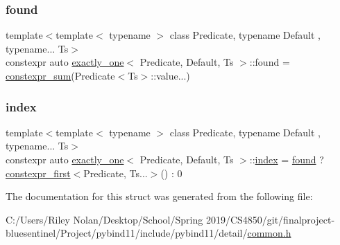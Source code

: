 \subsubsection{\texorpdfstring{found}{found}}
{\footnotesize\ttfamily template$<$template$<$ typename $>$ class Predicate, typename Default , typename... Ts$>$ \\
constexpr auto \mbox{\hyperlink{structexactly__one}{exactly\+\_\+one}}$<$ Predicate, Default, Ts $>$\+::found = \mbox{\hyperlink{detail_2common_8h_ac8088319c435e17ebb16da84203e9e3f}{constexpr\+\_\+sum}}(Predicate$<$Ts$>$\+::value...)\hspace{0.3cm}{\ttfamily [static]}}

\mbox{\label{structexactly__one_af0f0e1092da1fbf5d87040bb9428e613}} 
\subsubsection{\texorpdfstring{index}{index}}
{\footnotesize\ttfamily template$<$template$<$ typename $>$ class Predicate, typename Default , typename... Ts$>$ \\
constexpr auto \mbox{\hyperlink{structexactly__one}{exactly\+\_\+one}}$<$ Predicate, Default, Ts $>$\+::\mbox{\hyperlink{_s_d_l__opengl__glext_8h_a57f14e05b1900f16a2da82ade47d0c6d}{index}} = \mbox{\hyperlink{structexactly__one_a2e88399d33d5e51e1b27f785259f408c}{found}} ? \mbox{\hyperlink{detail_2common_8h_a3b338d68ac276f1ac405ef556cca63ad}{constexpr\+\_\+first}}$<$Predicate, Ts...$>$() \+: 0\hspace{0.3cm}{\ttfamily [static]}}



The documentation for this struct was generated from the following file\+:\begin{DoxyCompactItemize}
\item 
C\+:/\+Users/\+Riley Nolan/\+Desktop/\+School/\+Spring 2019/\+C\+S4850/git/finalproject-\/bluesentinel/\+Project/pybind11/include/pybind11/detail/\mbox{\hyperlink{detail_2common_8h}{common.\+h}}\end{DoxyCompactItemize}
